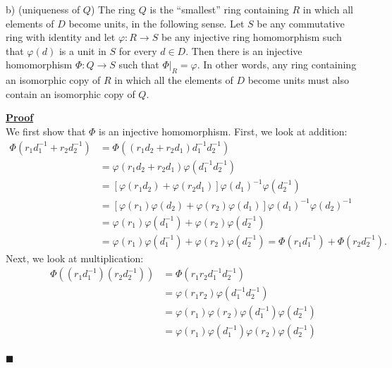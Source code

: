 \documentclass[12pt,a4paper]{article}
\newenvironment{proof}
{
\textbf{\underline{Proof}} \\
}
{
\hfill $\blacksquare$
}
\begin{document}
b) (uniqueness of $Q$) The ring $Q$ is the ``smallest'' ring containing $R$ in which all elements of $D$ become units, in the following sense.
Let $S$ be any commutative ring with identity and let $\varphi: R \to S$ be any injective ring homomorphism such that $\varphi(d)$ is a unit in $S$ for every $d \in D$.
Then there is an injective homomorphism $\Phi: Q \to S$ such that $\Phi |_{R} = \varphi$.
In other words, any ring containing an isomorphic copy of $R$ in which all the elements of $D$ become units must also contain an isomorphic copy of $Q$.

\begin{proof}
    We first show that $\Phi$ is an injective homomorphism.
    First, we look at addition:
    \begin{align*}
        \Phi\left( r_1 d_1^{-1} + r_2d_2^{-1} \right) &= \Phi\left( \left( r_1 d_2 + r_2 d_1 \right)d_1^{-1} d_2^{-1} \right) \\
        &= \varphi\left( r_1 d_2 + r_2 d_1 \right) \varphi\left( d_1^{-1} d_2^{-1} \right) \\
        &= \left[ \varphi\left( r_1 d_2 \right) + \varphi\left( r_2 d_1 \right) \right] \varphi\left( d_1 \right)^{-1} \varphi\left( d_2^{-1} \right) \\
        &= \left[ \varphi\left( r_1 \right)\varphi\left( d_2 \right) + \varphi\left( r_2 \right)\varphi\left( d_1 \right) \right] \varphi\left( d_1 \right)^{-1}\varphi\left( d_2 \right)^{-1} \\
        &= \varphi\left( r_1 \right)\varphi\left( d_1^{-1} \right) + \varphi\left( r_2 \right)\varphi\left( d_2^{-1} \right) \\
        &= \varphi\left( r_1 \right)\varphi\left( d_1^{-1} \right) + \varphi\left( r_2 \right)\varphi\left( d_2^{-1} \right) = \Phi\left( r_1 d_1^{-1} \right) + \Phi\left( r_2 d_2^{-1} \right)
    .\end{align*}
    Next, we look at multiplication:
    \begin{align*}
        \Phi\left( \left( r_1 d_1^{-1} \right)\left( r_2 d_2^{-1} \right) \right) &= \Phi\left( r_1 r_2 d_1^{-1} d_2^{-1} \right) \\
        &= \varphi\left( r_1 r_2 \right)\varphi\left( d_1^{-1}d_2^{-1} \right) \\
        &= \varphi\left( r_1 \right)\varphi\left( r_2 \right)\varphi\left( d_1^{-1} \right)\varphi\left( d_2^{-1} \right) \\
        &= \varphi\left( r_1 \right)\varphi(d_1^{-1})\varphi\left( r_2 \right)\varphi\left( d_2^{-1} \right) \\

\end{align*}
\end{proof}
\end{document}
